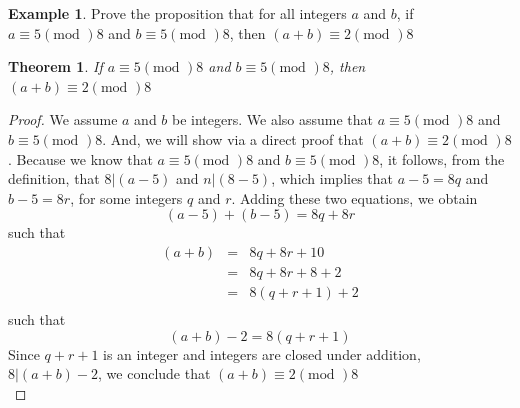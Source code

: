 \documentclass{book}
\newtheorem{theorem}{Theorem}[section]
\theoremstyle{definition}
\newtheorem{example}{Example}[definition]
\theoremstyle{remark}
\begin{document}
\newpage
\begin{example}
Prove the proposition that for all integers $a$ and $b$, if $a \equiv 5 (\text{mod }) 8$ and $b \equiv 5 (\text{mod }) 8$, then $(a+b) \equiv 2 (\text{mod }) 8$ \\

\begin{tcolorbox}
	\begin{theorem}
		If $a \equiv 5 (\text{mod })8$ and $b \equiv 5 (\text{mod })8$, then $(a + b) \equiv 2 (\text{mod })8$
	\end{theorem}
\end{tcolorbox}

\begin{proof}
We assume $a$ and $b$ be integers. We also assume that $a \equiv 5 (\text{mod })8$ and $b \equiv 5 (\text{mod })8$. And, we will show via a direct proof that $(a + b) \equiv 2 (\text{mod })8$. Because we know that $a \equiv 5 (\text{mod })8$ and $b \equiv 5 (\text{mod })8$, it follows, from the definition, that   $8 | (a-5)$ and $n | (8-5)$, which implies that $a-5 = 8q$ and $b-5 = 8r$, for some integers $q$ and $r$. Adding these two equations, we obtain \[ (a-5) + (b-5) = 8q + 8r \]such that
	\begin{eqnarray}
	(a+b)& = & 8q + 8r + 10 \nonumber \\
	& = & 8q + 8r + 8 + 2 \nonumber \\
	& = & 8(q + r + 1) + 2 \nonumber \\
	\end{eqnarray}	 
such that \[ (a+b) - 2 = 8(q + r + 1) \] 
Since $q + r + 1$ is an integer and integers are closed under addition, $8 | (a+b) - 2$, we conclude that $(a+b) \equiv 2 (\text{mod })8$ \\
\end{proof}
\end{example}
\end{document}

